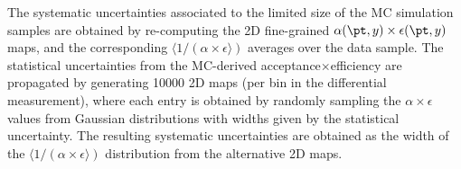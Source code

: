 \documentclass[11pt,twoside,a4paper,cmspaper]{cms-tdr}
\begin{document}
The systematic uncertainties associated to the limited size of the MC simulation samples are obtained by re-computing the 2D fine-grained $\alpha(\pt,y) \times \epsilon(\pt,y)$ maps, and the corresponding $\langle 1 / (\alpha\!\times\!\epsilon\rangle)$ averages over the data sample.
The statistical uncertainties from the MC-derived acceptance$\times$efficiency
are propagated by generating 10000 2D maps (per bin in the differential measurement), where each entry is obtained by randomly sampling 
the $\alpha\!\times\!\epsilon$ values from Gaussian distributions with widths given by the statistical uncertainty. The resulting systematic
uncertainties are obtained as the width of the $\langle 1 /(\alpha\!\times\!\epsilon\rangle)$ distribution from the alternative 2D maps. 
\end{document}
